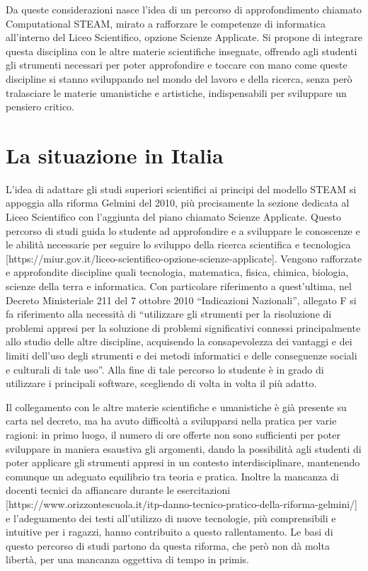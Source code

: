 Da queste considerazioni nasce l’idea di un percorso di approfondimento chiamato Computational STEAM, mirato a rafforzare le competenze di informatica all’interno del Liceo Scientifico, opzione Scienze Applicate. Si propone di integrare questa disciplina con le altre materie scientifiche insegnate, offrendo agli studenti gli strumenti necessari per poter approfondire e toccare con mano come queste discipline si stanno sviluppando nel mondo del lavoro e della ricerca, senza però tralasciare le materie umanistiche e artistiche, indispensabili per sviluppare un pensiero critico.



\section{La situazione in Italia}
\label{sec:problem}
L’idea di adattare gli studi superiori scientifici ai principi del modello STEAM si appoggia alla riforma Gelmini del 2010, più precisamente la sezione dedicata al Liceo Scientifico con l’aggiunta del piano chiamato Scienze Applicate. Questo percorso di studi guida lo studente ad approfondire e a sviluppare le conoscenze e le abilità necessarie per seguire lo sviluppo della ricerca scientifica e tecnologica [https://miur.gov.it/liceo-scientifico-opzione-scienze-applicate]. Vengono rafforzate e approfondite discipline quali tecnologia, matematica, fisica, chimica, biologia, scienze della terra e informatica. Con particolare riferimento a quest’ultima, nel Decreto Ministeriale 211 del 7 ottobre 2010 “Indicazioni Nazionali”, allegato F si fa riferimento alla necessità di “utilizzare gli strumenti per la risoluzione di problemi appresi per la soluzione di problemi significativi connessi principalmente allo studio delle altre discipline, acquisendo la consapevolezza dei vantaggi e dei limiti dell’uso degli strumenti e dei metodi informatici e delle conseguenze sociali e culturali di tale uso”. Alla fine di tale percorso lo studente è in grado di utilizzare i principali software, scegliendo di volta in volta il più adatto.

Il collegamento con le altre materie scientifiche e umanistiche è già presente su carta nel decreto, ma ha avuto difficoltà a svilupparsi nella pratica per varie ragioni: in primo luogo, il numero di ore offerte non sono sufficienti per poter sviluppare in maniera esaustiva gli argomenti, dando la possibilità agli studenti di poter applicare gli strumenti appresi in un contesto interdisciplinare, mantenendo comunque un adeguato equilibrio tra teoria e pratica. Inoltre la mancanza di docenti tecnici da affiancare durante le esercitazioni [https://www.orizzontescuola.it/itp-danno-tecnico-pratico-della-riforma-gelmini/] e l’adeguamento dei testi all’utilizzo di nuove tecnologie, più comprensibili e intuitive per i ragazzi, hanno contribuito a questo rallentamento. 
Le basi di questo percorso di studi partono da questa riforma, che però non dà molta libertà, per una mancanza oggettiva di tempo in primis.

